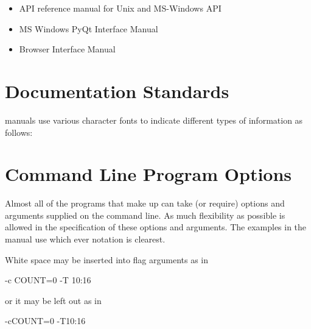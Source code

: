 \begin{itemize}
\item API reference manual for Unix and MS-Windows API
\item MS Windows PyQt Interface Manual
\item Browser Interface Manual
\end{itemize}
\section{Documentation Standards}
 manuals use various character fonts to indicate different types of information as follows:

\begin{center}





\end{center}

\section{Command Line Program Options}
Almost all of the programs that make up \ProductName{} can take (or require)
options and arguments supplied on the command line. As much flexibility
as possible is allowed in the specification of these options and
arguments. The examples in the manual use which ever notation is
clearest.

White space may be inserted into flag arguments as in

\begin{expara}

\BtrName{} -c COUNT=0 -T 10:16

\end{expara}

or it may be left out as in

\begin{expara}

\BtrName{} -cCOUNT=0 -T10:16

\end{expara}

